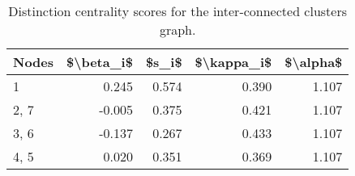 \begin{table}
\centering
\caption{\label{tab:inter}Distinction centrality scores for the inter-connected clusters graph.}
\centering
\begin{tabular}[t]{lrrrr}
\toprule
Nodes & \$\textbackslash{}beta\_i\$ & \$s\_i\$ & \$\textbackslash{}kappa\_i\$ & \$\textbackslash{}alpha\$\\
\midrule
1 & 0.245 & 0.574 & 0.390 & 1.107\\
2, 7 & -0.005 & 0.375 & 0.421 & 1.107\\
3, 6 & -0.137 & 0.267 & 0.433 & 1.107\\
4, 5 & 0.020 & 0.351 & 0.369 & 1.107\\
\bottomrule
\end{tabular}
\end{table}
